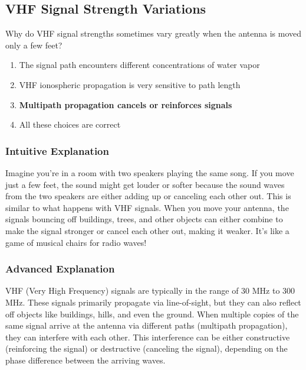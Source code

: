 \subsection{VHF Signal Strength Variations}\label{T3A01}

\begin{tcolorbox}[colback=gray!10!white,colframe=black!75!black,title=T3A01]
Why do VHF signal strengths sometimes vary greatly when the antenna is moved only a few feet?
\begin{enumerate}[label=\Alph*)]
    \item The signal path encounters different concentrations of water vapor
    \item VHF ionospheric propagation is very sensitive to path length
    \item \textbf{Multipath propagation cancels or reinforces signals}
    \item All these choices are correct
\end{enumerate}
\end{tcolorbox}

\subsubsection{Intuitive Explanation}
Imagine you're in a room with two speakers playing the same song. If you move just a few feet, the sound might get louder or softer because the sound waves from the two speakers are either adding up or canceling each other out. This is similar to what happens with VHF signals. When you move your antenna, the signals bouncing off buildings, trees, and other objects can either combine to make the signal stronger or cancel each other out, making it weaker. It's like a game of musical chairs for radio waves!

\subsubsection{Advanced Explanation}
VHF (Very High Frequency) signals are typically in the range of 30 MHz to 300 MHz. These signals primarily propagate via line-of-sight, but they can also reflect off objects like buildings, hills, and even the ground. When multiple copies of the same signal arrive at the antenna via different paths (multipath propagation), they can interfere with each other. This interference can be either constructive (reinforcing the signal) or destructive (canceling the signal), depending on the phase difference between the arriving waves.

